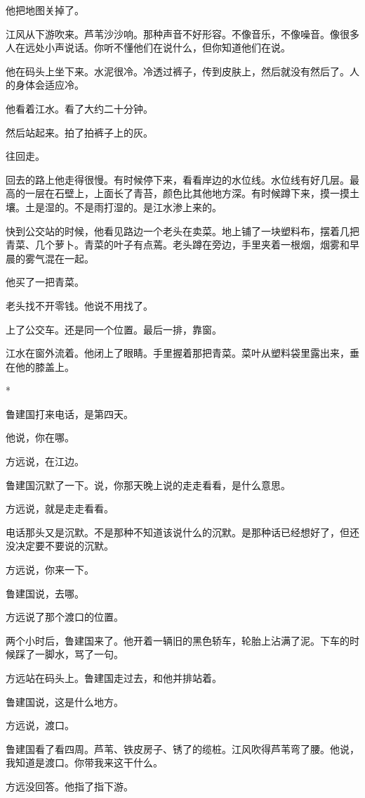 \documentclass[UTF8,a5paper,11pt,openany]{ctexbook}
\newcommand{\scene}{\vspace{1em}\begin{center}*\quad*\quad*\end{center}\vspace{0.5em}}
\begin{document}
他把地图关掉了。

江风从下游吹来。芦苇沙沙响。那种声音不好形容。不像音乐，不像噪音。像很多人在远处小声说话。你听不懂他们在说什么，但你知道他们在说。

他在码头上坐下来。水泥很冷。冷透过裤子，传到皮肤上，然后就没有然后了。人的身体会适应冷。

他看着江水。看了大约二十分钟。

然后站起来。拍了拍裤子上的灰。

往回走。

回去的路上他走得很慢。有时候停下来，看看岸边的水位线。水位线有好几层。最高的一层在石壁上，上面长了青苔，颜色比其他地方深。有时候蹲下来，摸一摸土壤。土是湿的。不是雨打湿的。是江水渗上来的。

快到公交站的时候，他看见路边一个老头在卖菜。地上铺了一块塑料布，摆着几把青菜、几个萝卜。青菜的叶子有点蔫。老头蹲在旁边，手里夹着一根烟，烟雾和早晨的雾气混在一起。

他买了一把青菜。

老头找不开零钱。他说不用找了。

上了公交车。还是同一个位置。最后一排，靠窗。

江水在窗外流着。他闭上了眼睛。手里握着那把青菜。菜叶从塑料袋里露出来，垂在他的膝盖上。


\scene

鲁建国打来电话，是第四天。

他说，你在哪。

方远说，在江边。

鲁建国沉默了一下。说，你那天晚上说的走走看看，是什么意思。

方远说，就是走走看看。

电话那头又是沉默。不是那种不知道该说什么的沉默。是那种话已经想好了，但还没决定要不要说的沉默。

方远说，你来一下。

鲁建国说，去哪。

方远说了那个渡口的位置。

两个小时后，鲁建国来了。他开着一辆旧的黑色轿车，轮胎上沾满了泥。下车的时候踩了一脚水，骂了一句。

方远站在码头上。鲁建国走过去，和他并排站着。

鲁建国说，这是什么地方。

方远说，渡口。

鲁建国看了看四周。芦苇、铁皮房子、锈了的缆桩。江风吹得芦苇弯了腰。他说，我知道是渡口。你带我来这干什么。

方远没回答。他指了指下游。
\end{document}
